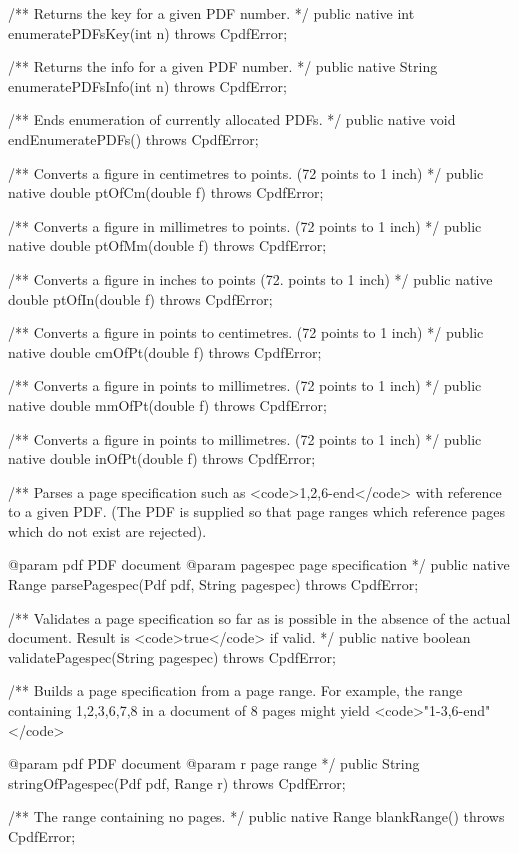 /** Returns the key for a given PDF number. */
public native int enumeratePDFsKey(int n) throws CpdfError;

/** Returns the info for a given PDF number. */
public native String enumeratePDFsInfo(int n) throws CpdfError;

/** Ends enumeration of currently allocated PDFs. */
public native void endEnumeratePDFs() throws CpdfError;

/** Converts a figure in centimetres to points. (72 points to 1 inch) */
public native double ptOfCm(double f) throws CpdfError;

/** Converts a figure in millimetres to points. (72 points to 1 inch) */
public native double ptOfMm(double f) throws CpdfError;

/** Converts a figure in inches to points (72. points to 1 inch) */
public native double ptOfIn(double f) throws CpdfError;

/** Converts a figure in points to centimetres. (72 points to 1 inch) */
public native double cmOfPt(double f) throws CpdfError;

/** Converts a figure in points to millimetres. (72 points to 1 inch) */
public native double mmOfPt(double f) throws CpdfError;

/** Converts a figure in points to millimetres. (72 points to 1 inch) */
public native double inOfPt(double f) throws CpdfError;

/** Parses a page specification such as <code>1,2,6-end</code> with
reference to a given PDF. (The PDF is supplied so that page ranges which
reference pages which do not exist are rejected).

@param pdf PDF document
@param pagespec page specification */
public native Range parsePagespec(Pdf pdf, String pagespec)
    throws CpdfError;

/** Validates a page specification so far as is possible in the absence of
the actual document. Result is <code>true</code> if valid. */
public native boolean validatePagespec(String pagespec) throws CpdfError;

/** Builds a page specification from a page range. For example, the range
containing 1,2,3,6,7,8 in a document of 8 pages might yield
<code>"1-3,6-end"</code>

@param pdf PDF document
@param r page range
*/
public String stringOfPagespec(Pdf pdf, Range r) throws CpdfError;

/** The range containing no pages. */
public native Range blankRange() throws CpdfError;

